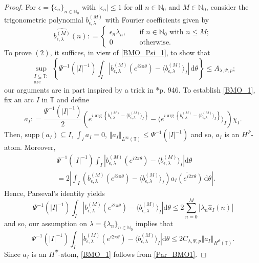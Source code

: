 \documentclass[a4paper, leqno, 10pt]{amsart}
\numberwithin{equation}{section}
\newcommand{\dd}{\mathrm{d}}
\newcommand{\T}{\mathbb{T}}
\newcommand{\norm}[1]{\left\Vert#1\right\Vert}
\newcommand{\brkt}[1]{\left(#1\right)}
\newcommand{\abs}[1]{\left|#1\right|}
\newcommand{\N}{\mathbb{N}}
\begin{document}
\begin{proof}
For $\epsilon = \{ \epsilon_n \}_{n \in \N_0}$ with $| \epsilon_n | \leq 1$ for all $n \in \N_0$ and $M \in \N_0$, consider the trigonometric polynomial $b_{ \epsilon, \lambda }^{(M)}$ with Fourier coefficients given by 
\[
\widehat{b_{ \epsilon, \lambda }^{(M)}} (n): =
\begin{cases}
\epsilon_n \lambda_n , \quad &\text{if } n \in \N_0 \text{ with } n \leq M ; \\
0 \quad &\text{otherwise.}
\end{cases}
\]
To prove $(2)$, it suffices, in view of \eqref{BMO_Psi_1}, to show that 
\begin{equation}\label{BMO_1}
\sup_{\substack{ I \subseteq \T : \\ \text{arc}}} \left\{ \Psi^{-1} ( | I |^{-1} ) \int_I \abs{ b_{ \epsilon, \lambda }^{(M)} (e^{i 2 \pi \theta} ) - \langle b_{ \epsilon , \lambda }^{(M)} \rangle_I }\, \dd \theta \right\} \leq A_{\lambda, \Psi, p};   
\end{equation}
our arguments are in part inspired by a trick in \cite{JPS}*{p. 946}.
To establish \eqref{BMO_1}, fix an arc $I$ in $\T$ and define
\[ a_I  : = \frac{ \Psi^{-1} ( | I |^{-1} )}{2}   \brkt{ e^{ i \arg \left\{ b_{ \epsilon , \lambda }^{(M)} - \langle b_{  \epsilon , \lambda }^{(M)} \rangle_I \right\}} - \langle e^{ i \arg \left\{ b_{ \epsilon,  \lambda }^{(M)} - \langle b_{ \epsilon, \lambda}^{(M)} \rangle_I  \right\}} \rangle_I } \chi_I.
 \]
Then, $\mathrm{supp} (a_I) \subseteq I$, $ \int_I a_I = 0$, $\norm{ a_I }_{L^{\infty} (\T)} \leq \Psi^{-1} ( | I |^{-1} )$ and so, $a_I $ is an $H^{\Psi}$-atom. Moreover,
\begin{align*}
& \Psi^{-1} ( | I |^{-1} ) \int_I \abs{ b_{ \epsilon , \lambda}^{(M)} (e^{i 2 \pi \theta} ) - \langle b_{ \epsilon , \lambda}^{(M)} \rangle_I } \dd \theta  \\
& =2 \abs{ \int_I \brkt{ b_{ \epsilon , \lambda}^{(M)} (e^{i 2 \pi \theta} ) - \langle b_{ \epsilon, \lambda }^{(M)} \rangle_I } \overline{a_I (e^{i2 \pi \theta})} \, \dd \theta } . 
\end{align*}
Hence, Parseval's identity yields
\[ \Psi^{-1} ( | I |^{-1} ) \int_I \abs{ b_{ \epsilon , \lambda }^{(M)} (e^{i 2 \pi \theta} ) - \langle b_{ \epsilon, \lambda}^{(M)} \rangle_I } \dd \theta \leq 2 \sum_{n = 0 }^M | \lambda_n \widehat{a}_I (n) | 
\]
and so, our assumption on $\lambda = \{ \lambda_n \}_{n \in \N_0}$ implies that
\begin{equation}\label{Par_BMO1}
\Psi^{-1} ( | I |^{-1} ) \int_I \abs{ b_{ \epsilon , \lambda}^{(M)} (e^{i 2 \pi \theta} ) - \langle b_{ \epsilon, \lambda }^{(M)} \rangle_I } \dd \theta  \leq 2 C_{\lambda, \Psi, p} \norm{a_I}_{H^{\Psi}(\T)} . 
\end{equation}
Since $a_I$ is an $H^{\Psi}$-atom, \eqref{BMO_1} follows from \eqref{Par_BMO1}. \end{proof}
\end{document}
